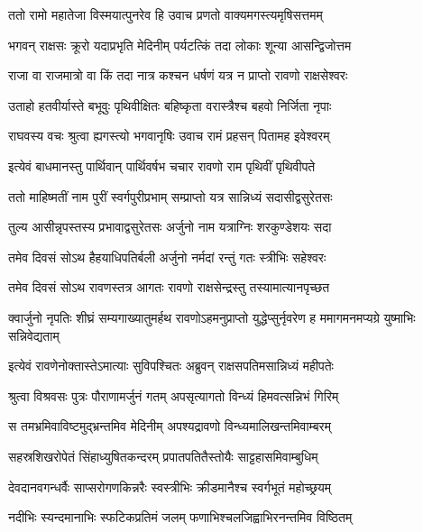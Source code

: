 
\twolineshloka
{ततो रामो महातेजा विस्मयात्पुनरेव हि}
{उवाच प्रणतो वाक्यमगस्त्यमृषिसत्तमम्} %

\twolineshloka
{भगवन् राक्षसः क्रूरो यदाप्रभृति मेदिनीम्}
{पर्यटत्किं तदा लोकाः शून्या आसन्द्विजोत्तम} %

\twolineshloka
{राजा वा राजमात्रो वा किं तदा नात्र कश्चन}
{धर्षणं यत्र न प्राप्तो रावणो राक्षसेश्वरः} %

\twolineshloka
{उताहो हतवीर्यास्ते बभूवुः पृथिवीक्षितः}
{बहिष्कृता वरास्त्रैश्च बहवो निर्जिता नृपाः} %

\twolineshloka
{राघवस्य वचः श्रुत्वा ह्यगस्त्यो भगवानृषिः}
{उवाच रामं प्रहसन् पितामह इवेश्वरम्} %

\twolineshloka
{इत्येवं बाधमानस्तु पार्थिवान् पार्थिवर्षभ}
{चचार रावणो राम पृथिवीं पृथिवीपते} %

\twolineshloka
{ततो माहिष्मतीं नाम पुरीं स्वर्गपुरीप्रभाम्}
{सम्प्राप्तो यत्र सान्निध्यं सदासीद्वसुरेतसः} %

\twolineshloka
{तुल्य आसीन्नृपस्तस्य प्रभावाद्वसुरेतसः}
{अर्जुनो नाम यत्राग्निः शरकुण्डेशयः सदा} %

\twolineshloka
{तमेव दिवसं सोऽथ हैहयाधिपतिर्बली}
{अर्जुनो नर्मदां रन्तुं गतः स्त्रीभिः सहेश्वरः} %

\twolineshloka
{तमेव दिवसं सोऽथ रावणस्तत्र आगतः}
{रावणो राक्षसेन्द्रस्तु तस्यामात्यानपृच्छत} %

\threelineshloka
{क्वार्जुनो नृपतिः शीघ्रं सम्यगाख्यातुमर्हथ}
{रावणोऽहमनुप्राप्तो युद्धेप्सुर्नृवरेण ह}
{ममागमनमप्यग्रे युष्माभिः सन्निवेद्यताम्} %

\twolineshloka
{इत्येवं रावणेनोक्तास्तेऽमात्याः सुविपश्चितः}
{अब्रुवन् राक्षसपतिमसान्निध्यं महीपतेः} %

\twolineshloka
{श्रुत्वा विश्रवसः पुत्रः पौराणामर्जुनं गतम्}
{अपसृत्यागतो विन्ध्यं हिमवत्सन्निभं गिरिम्} %

\twolineshloka
{स तमभ्रमिवाविष्टमुद्भ्रन्तमिव मेदिनीम्}
{अपश्यद्रावणो विन्ध्यमालिखन्तमिवाम्बरम्} %

\twolineshloka
{सहस्रशिखरोपेतं सिंहाध्युषितकन्दरम्}
{प्रपातपतितैस्तोयैः साट्टहासमिवाम्बुधिम्} %

\twolineshloka
{देवदानवगन्धर्वैः साप्सरोगणकिन्नरैः}
{स्वस्त्रीभिः क्रीडमानैश्च स्वर्गभूतं महोच्छ्रयम्} %

\twolineshloka
{नदीभिः स्यन्दमानाभिः स्फटिकप्रतिमं जलम्}
{फणाभिश्चलजिह्वाभिरनन्तमिव विष्ठितम्} %

